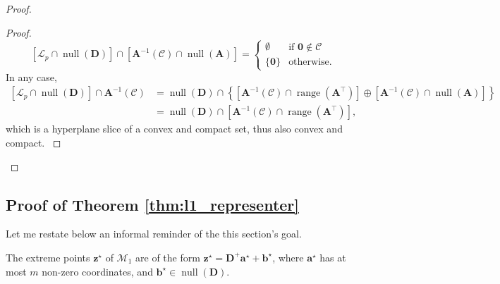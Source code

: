 \begin{proof}
\begin{proof}
{\begin{equation*}
                        \left [ \mathcal{L}_p \cap \operatorname{null} \left( \mathbf{D} \right) \right ] \cap \left [ \mathbf{A}^{-1}(\mathcal{C}) \cap \operatorname{null} \left ( \mathbf{A} \right ) \right ] = \left \{
                        \begin{matrix}
                            \emptyset & \text{if } \mathbf{0} \notin \mathcal{C} \\
                            \{ \mathbf{0} \} & \text{otherwise}.
                        \end{matrix}
                        \right.
                    \end{equation*}
                    In any case,
                    \begin{align*}
                        \left [ \mathcal{L}_p \cap \operatorname{null} \left( \mathbf{D} \right) \right ] \cap \mathbf{A}^{-1}(\mathcal{C}) & = \operatorname{null} \left( \mathbf{D} \right) \cap \left \{ \left [ \mathbf{A}^{-1}(\mathcal{C}) \cap \operatorname{range} \left( \mathbf{A}^\top \right) \right ] \oplus \left [ \mathbf{A}^{-1}(\mathcal{C}) \cap \operatorname{null} \left ( \mathbf{A} \right ) \right ] \right \}\\
                        & = \operatorname{null} \left( \mathbf{D} \right) \cap \left [ \mathbf{A}^{-1}(\mathcal{C}) \cap \operatorname{range} \left( \mathbf{A}^\top \right) \right ],
                    \end{align*}
                    which is a hyperplane slice of a convex and compact set, thus also convex and compact.
                }
                \qedsymbol
            \end{proof}
        \qedstep
\end{proof}


\subsection{Proof of Theorem \ref{thm:l1_representer}}\label{ap:representer_l1}

Let me restate below an informal reminder of the this section's goal.

\begin{claim}
    The extreme points $\mathbf{z}^\star$ of $\mathcal{M}_1$ are of the form $\mathbf{z}^\star = \mathbf{D}^+ \mathbf{a}^\star + \mathbf{b}^\star$, where $\mathbf{a}^\star$ has at most $m$ non-zero coordinates, and $\mathbf{b}^\star \in \operatorname{null} \left ( \mathbf{D} \right )$.
\end{claim}

